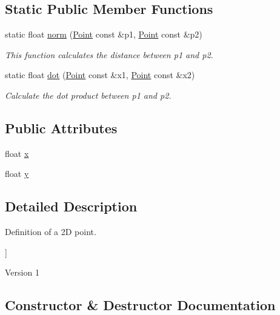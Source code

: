 \subsection*{Static Public Member Functions}
\begin{DoxyCompactItemize}
\item 
static float \mbox{\hyperlink{struct_point_ae1e4ca1c92d69fdb5a4c77ddf0a17c9b}{norm}} (\mbox{\hyperlink{struct_point}{Point}} const \&p1, \mbox{\hyperlink{struct_point}{Point}} const \&p2)
\begin{DoxyCompactList}\small\item\em This function calculates the distance between p1 and p2. \end{DoxyCompactList}\item 
static float \mbox{\hyperlink{struct_point_a92d37e3374be80b770e9a43b54c0eec4}{dot}} (\mbox{\hyperlink{struct_point}{Point}} const \&x1, \mbox{\hyperlink{struct_point}{Point}} const \&x2)
\begin{DoxyCompactList}\small\item\em Calculate the dot product between p1 and p2. \end{DoxyCompactList}\end{DoxyCompactItemize}
\subsection*{Public Attributes}
\begin{DoxyCompactItemize}
\item 
float \mbox{\hyperlink{struct_point_a05dfe2dfbde813ad234b514f30e662f1}{x}}
\item 
float \mbox{\hyperlink{struct_point_a6101960c8d2d4e8ea1d32c9234bbeb8d}{y}}
\end{DoxyCompactItemize}


\subsection{Detailed Description}
Definition of a 2D point. 

\mbox{]} \begin{DoxyVersion}{Version}
1 
\end{DoxyVersion}


\subsection{Constructor \& Destructor Documentation}
\mbox{\label{struct_point_ae21aa995e6a4c5d1b21f6e45d7a2fee8}} 
